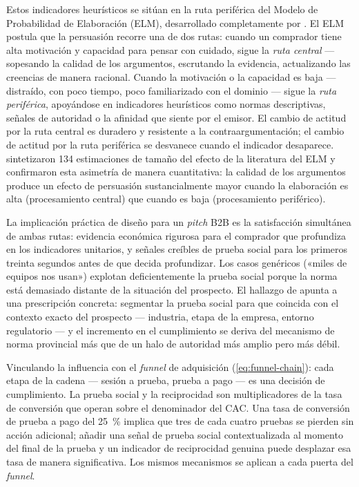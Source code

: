 Estos indicadores heurísticos se sitúan en la ruta periférica del Modelo de Probabilidad de
Elaboración (ELM), desarrollado completamente por \textcite{petty1986elaboration}. El ELM
postula que la persuasión recorre una de dos rutas: cuando un comprador tiene alta motivación
y capacidad para pensar con cuidado, sigue la \emph{ruta central} --- sopesando la calidad de
los argumentos, escrutando la evidencia, actualizando las creencias de manera racional. Cuando
la motivación o la capacidad es baja --- distraído, con poco tiempo, poco familiarizado con el
dominio --- sigue la \emph{ruta periférica}, apoyándose en indicadores heurísticos como normas
descriptivas, señales de autoridad o la afinidad que siente por el emisor. El cambio de actitud
por la ruta central es duradero y resistente a la contraargumentación; el cambio de actitud por
la ruta periférica se desvanece cuando el indicador desaparece. \textcite{carpenter2015meta}
sintetizaron 134 estimaciones de tamaño del efecto de la literatura del ELM y confirmaron esta
asimetría de manera cuantitativa: la calidad de los argumentos produce un efecto de persuasión
sustancialmente mayor cuando la elaboración es alta (procesamiento central) que cuando es baja
(procesamiento periférico).

La implicación práctica de diseño para un \emph{pitch} B2B es la satisfacción simultánea de
ambas rutas: evidencia económica rigurosa para el comprador que profundiza en los indicadores
unitarios, y señales creíbles de prueba social para los primeros treinta segundos antes de que
decida profundizar. Los casos genéricos («miles de equipos nos usan») explotan deficientemente
la prueba social porque la norma está demasiado distante de la situación del prospecto. El
hallazgo de \textcite{goldstein2008field} apunta a una prescripción concreta: segmentar la
prueba social para que coincida con el contexto exacto del prospecto --- industria, etapa de
la empresa, entorno regulatorio --- y el incremento en el cumplimiento se deriva del mecanismo
de norma provincial más que de un halo de autoridad más amplio pero más débil.

Vinculando la influencia con el \emph{funnel} de adquisición (\cref{eq:funnel-chain}): cada
etapa de la cadena --- sesión a prueba, prueba a pago --- es una decisión de cumplimiento.
La prueba social y la reciprocidad son multiplicadores de la tasa de conversión que operan
sobre el denominador del CAC. Una tasa de conversión de prueba a pago del \qty{25}{\percent}
implica que tres de cada cuatro pruebas se pierden sin acción adicional; añadir una señal de
prueba social contextualizada al momento del final de la prueba y un indicador de reciprocidad
genuina puede desplazar esa tasa de manera significativa. Los mismos mecanismos se aplican a
cada puerta del \emph{funnel}.

